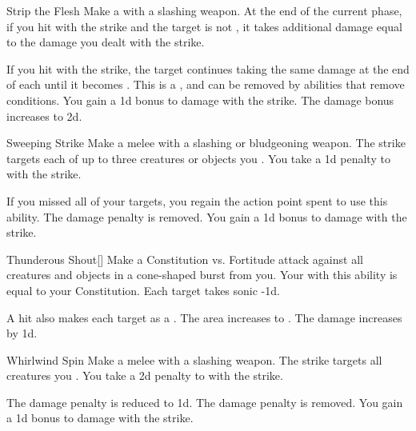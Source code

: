 {            \begin{ability}{Strip the Flesh}
                Make a  with a slashing weapon.
                At the end of the current phase, if you hit with the strike and the target is not , it takes additional damage equal to the damage you dealt with the strike.

                \rankline
                 If you hit with the strike, the target continues taking the same damage at the end of each  until it becomes .
                This is a , and can be removed by abilities that remove conditions.
                 You gain a \plus1d bonus to damage with the strike.
                 The damage bonus increases to \plus2d.
            \end{ability}

            \begin{ability}{Sweeping Strike}
                Make a melee  with a slashing or bludgeoning weapon.
                The strike targets each of up to three creatures or objects you .
                You take a \minus1d penalty to  with the strike.

                \rankline
                 If you missed all of your targets, you regain the action point spent to use this ability.
                 The damage penalty is removed.
                 You gain a \plus1d bonus to damage with the strike.
            \end{ability}

            \begin{ability}{Thunderous Shout}[]
                Make a Constitution vs. Fortitude attack against all creatures and objects in a \areamed cone-shaped burst from you.
                Your  with this ability is equal to your Constitution.
                \hit Each target takes sonic  -1d.

                \rankline
                 A hit also makes each target  as a .
                 The area increases to \arealarge.
                 The damage increases by \plus1d.
            \end{ability}

            \begin{ability}{Whirlwind Spin}
                Make a melee  with a slashing weapon.
                The strike targets all creatures you .
                You take a \minus2d penalty to  with the strike.

                \rankline
                 The damage penalty is reduced to \minus1d.
                 The damage penalty is removed.
                 You gain a \plus1d bonus to damage with the strike.
            \end{ability}
        }

